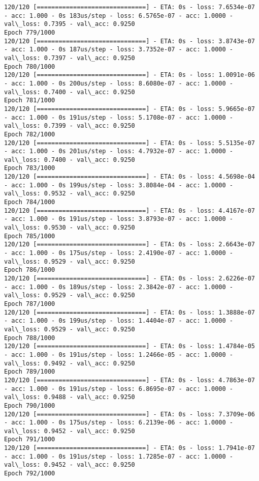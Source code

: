 \documentclass[11pt]{article}
\begin{document}
\begin{Verbatim}[commandchars=\\\{\}]
120/120 [==============================] - ETA: 0s - loss: 7.6534e-07 - acc: 1.000 - 0s 183us/step - loss: 6.5765e-07 - acc: 1.0000 - val\_loss: 0.7395 - val\_acc: 0.9250
Epoch 779/1000
120/120 [==============================] - ETA: 0s - loss: 3.8743e-07 - acc: 1.000 - 0s 187us/step - loss: 3.7352e-07 - acc: 1.0000 - val\_loss: 0.7397 - val\_acc: 0.9250
Epoch 780/1000
120/120 [==============================] - ETA: 0s - loss: 1.0091e-06 - acc: 1.000 - 0s 200us/step - loss: 8.6080e-07 - acc: 1.0000 - val\_loss: 0.7400 - val\_acc: 0.9250
Epoch 781/1000
120/120 [==============================] - ETA: 0s - loss: 5.9665e-07 - acc: 1.000 - 0s 191us/step - loss: 5.1708e-07 - acc: 1.0000 - val\_loss: 0.7399 - val\_acc: 0.9250
Epoch 782/1000
120/120 [==============================] - ETA: 0s - loss: 5.5135e-07 - acc: 1.000 - 0s 201us/step - loss: 4.7932e-07 - acc: 1.0000 - val\_loss: 0.7400 - val\_acc: 0.9250
Epoch 783/1000
120/120 [==============================] - ETA: 0s - loss: 4.5698e-04 - acc: 1.000 - 0s 199us/step - loss: 3.8084e-04 - acc: 1.0000 - val\_loss: 0.9532 - val\_acc: 0.9250
Epoch 784/1000
120/120 [==============================] - ETA: 0s - loss: 4.4167e-07 - acc: 1.000 - 0s 191us/step - loss: 3.8793e-07 - acc: 1.0000 - val\_loss: 0.9530 - val\_acc: 0.9250
Epoch 785/1000
120/120 [==============================] - ETA: 0s - loss: 2.6643e-07 - acc: 1.000 - 0s 175us/step - loss: 2.4190e-07 - acc: 1.0000 - val\_loss: 0.9529 - val\_acc: 0.9250
Epoch 786/1000
120/120 [==============================] - ETA: 0s - loss: 2.6226e-07 - acc: 1.000 - 0s 189us/step - loss: 2.3842e-07 - acc: 1.0000 - val\_loss: 0.9529 - val\_acc: 0.9250
Epoch 787/1000
120/120 [==============================] - ETA: 0s - loss: 1.3888e-07 - acc: 1.000 - 0s 199us/step - loss: 1.4404e-07 - acc: 1.0000 - val\_loss: 0.9529 - val\_acc: 0.9250
Epoch 788/1000
120/120 [==============================] - ETA: 0s - loss: 1.4784e-05 - acc: 1.000 - 0s 191us/step - loss: 1.2466e-05 - acc: 1.0000 - val\_loss: 0.9492 - val\_acc: 0.9250
Epoch 789/1000
120/120 [==============================] - ETA: 0s - loss: 4.7863e-07 - acc: 1.000 - 0s 191us/step - loss: 6.8695e-07 - acc: 1.0000 - val\_loss: 0.9488 - val\_acc: 0.9250
Epoch 790/1000
120/120 [==============================] - ETA: 0s - loss: 7.3709e-06 - acc: 1.000 - 0s 175us/step - loss: 6.2139e-06 - acc: 1.0000 - val\_loss: 0.9452 - val\_acc: 0.9250
Epoch 791/1000
120/120 [==============================] - ETA: 0s - loss: 1.7941e-07 - acc: 1.000 - 0s 191us/step - loss: 1.7285e-07 - acc: 1.0000 - val\_loss: 0.9452 - val\_acc: 0.9250
Epoch 792/1000

\end{Verbatim}
\end{document}
